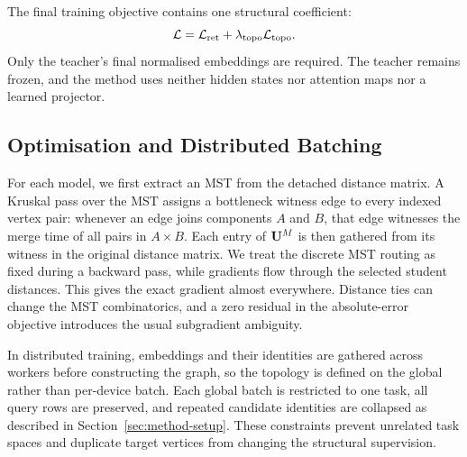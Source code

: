 The final training objective contains one structural coefficient:
\begin{equation}
    \mathcal{L}
    = \mathcal{L}_{\mathrm{ret}} + \lambda_{\mathrm{topo}}\mathcal{L}_{\mathrm{topo}}.
    \label{eq:full-objective}
\end{equation}
Only the teacher's final normalised embeddings are required. The teacher
remains frozen, and the method uses neither hidden states nor attention maps
nor a learned projector.

\subsection{Optimisation and Distributed Batching}
\label{sec:method-optimisation}

For each model, we first extract an MST from the detached distance matrix. A
Kruskal pass over the MST assigns a bottleneck witness edge to every indexed
vertex pair: whenever an edge joins components $A$ and $B$, that edge witnesses
the merge time of all pairs in $A\times B$. Each entry of $\mathbf{U}^M$ is then
gathered from its witness in the original distance matrix. We treat the
discrete MST routing as fixed during a backward pass, while gradients flow
through the selected student distances. This gives the exact gradient almost
everywhere. Distance ties can change the MST combinatorics, and a zero residual
in the absolute-error objective introduces the usual subgradient ambiguity.

In distributed training, embeddings and their identities are gathered across
workers before constructing the graph, so the topology is defined on the
global rather than per-device batch. Each global batch is restricted to one
task, all query rows are preserved, and repeated candidate identities are
collapsed as described in Section~\ref{sec:method-setup}. These constraints
prevent unrelated task spaces and duplicate target vertices from changing the
structural supervision.
